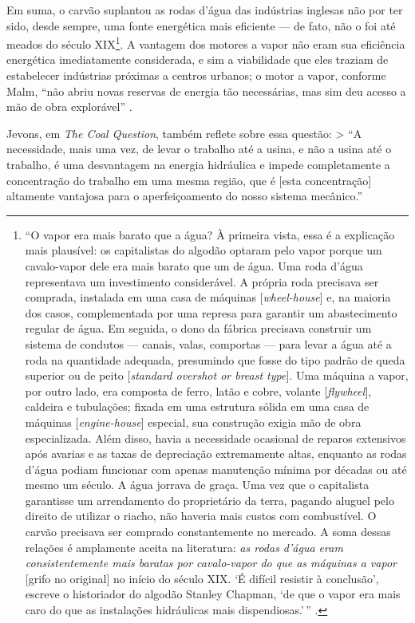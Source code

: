 \documentclass[12pt]{article}
\numberwithin{equation}{section}
\theoremstyle{plain}
\theoremstyle{definition}
\theoremstyle{remark}
\begin{document}
Em suma, o carvão suplantou as rodas d'água das indústrias inglesas não por ter sido, desde sempre, uma fonte energética mais eficiente --- de fato, não o foi até meados do século XIX\footnote{``O vapor era mais barato que a água? À primeira vista, essa é a explicação mais plausível: os capitalistas do algodão optaram pelo vapor porque um cavalo-vapor dele era mais barato que um de água. Uma roda d'água representava um investimento considerável. A própria roda precisava ser comprada, instalada em uma casa de máquinas {[}\textit{wheel-house}{]} e, na maioria dos casos, complementada por uma represa para garantir um abastecimento regular de água. Em seguida, o dono da fábrica precisava construir um sistema de condutos --- canais, valas, comportas --- para levar a água até a roda na quantidade adequada, presumindo que fosse do tipo padrão de queda superior ou de peito {[}\textit{standard overshot or breast type}{]}. Uma máquina a vapor, por outro lado, era composta de ferro, latão e cobre, volante {[}\textit{flywheel}{]}, caldeira e tubulações; fixada em uma estrutura sólida em uma casa de máquinas {[}\textit{engine-house}{]} especial, sua construção exigia mão de obra especializada. Além disso, havia a necessidade ocasional de reparos extensivos após avarias e as taxas de depreciação extremamente altas, enquanto as rodas d'água podiam funcionar com apenas manutenção mínima por décadas ou até mesmo um século. A água jorrava de graça. Uma vez que o capitalista garantisse um arrendamento do proprietário da terra, pagando aluguel pelo direito de utilizar o riacho, não haveria mais custos com combustível. O carvão precisava ser comprado constantemente no mercado. A soma dessas relações é amplamente aceita na literatura: \textit{as rodas d'água eram consistentemente mais baratas por cavalo-vapor do que as máquinas a vapor} {[}grifo no original{]} no início do século XIX. `É difícil resistir à conclusão', escreve o historiador do algodão Stanley Chapman, `de que o vapor era mais caro do que as instalações hidráulicas mais dispendiosas.'\,'' \parencite[, p. 29-30]{Malm2013}.}. A vantagem dos motores a vapor não eram sua eficiência energética imediatamente considerada, e sim a viabilidade que eles traziam de estabelecer indústrias próximas a centros urbanos; o motor a vapor, conforme Malm, ``não abriu novas reservas de energia tão necessárias, mas sim deu acesso a mão de obra explorável'' \parencite[, p. 33]{Malm2013}.

Jevons, em \textit{The Coal Question}, também reflete sobre essa questão: \textgreater{} ``A necessidade, mais uma vez, de levar o trabalho até a usina, e não a usina até o trabalho, é uma desvantagem na energia hidráulica e impede completamente a concentração do trabalho em uma mesma região, que é {[}esta concentração{]} altamente vantajosa para o aperfeiçoamento do nosso sistema mecânico.'' \parencite[, p. 89]{Jevons1866}
\end{document}
